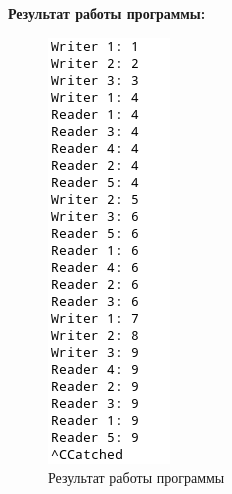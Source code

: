 \documentclass[14pt, a4paper]{extarticle}
\begin{document}
\textbf{Результат работы программы:}\par
\begin{figure}[h!]
	\centering
	\includegraphics[scale=1]{source/2.png}
	\caption{Результат работы программы}
	\label{Example2}
\end{figure}\par
\end{document}
